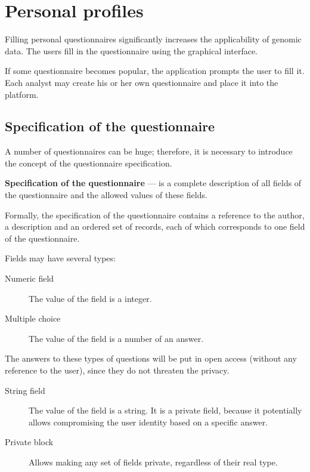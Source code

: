 ﻿\section{Personal profiles}
Filling personal questionnaires significantly increases the applicability of genomic data. The users fill in the questionnaire using the graphical interface.

\begin{note}
If some questionnaire becomes popular, the application prompts the user to fill it. Each analyst may create his or her own questionnaire and place it into the platform.
\end{note}

\subsection{Specification of the questionnaire}
A number of questionnaires can be huge; therefore, it is necessary to introduce the concept of the questionnaire specification.

\textbf{Specification of the questionnaire} --- is a complete description of all fields of the questionnaire and the allowed values of these fields.

\begin{note}
Formally, the specification of the questionnaire contains a reference to the author, a description and an ordered set of records, each of which corresponds to one field of the questionnaire.
\end{note}

Fields may have several types:
\begin{description}
  \item[Numeric field] The value of the field is a integer.

  \item[Multiple choice] The value of the field is a number of an answer.
\end{description}

  \begin{note}
    The answers to these types of questions will be put in open access (without any reference to the user), since they do not threaten the privacy.
  \end{note}

\begin{description}
  \item[String field] The value of the field is a string. It is a private field, because it potentially allows compromising the user identity based on a specific answer.

  \item[Private block] Allows making any set of fields private, regardless of their real type.

\end{description}

